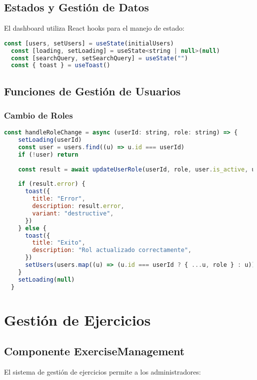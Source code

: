 \documentclass[12pt,a4paper]{article}
\begin{document}
\subsection{Estados y Gestión de Datos}

El dashboard utiliza React hooks para el manejo de estado:

\begin{lstlisting}[language=JavaScript, caption=Estados del componente AdminDashboard]
  const [users, setUsers] = useState(initialUsers)
  const [loading, setLoading] = useState<string | null>(null)
  const [searchQuery, setSearchQuery] = useState("")
  const { toast } = useToast()
\end{lstlisting}

\subsection{Funciones de Gestión de Usuarios}

\subsubsection{Cambio de Roles}
\begin{lstlisting}[language=JavaScript, caption=Función handleRoleChange]
  const handleRoleChange = async (userId: string, role: string) => {
    setLoading(userId)
    const user = users.find((u) => u.id === userId)
    if (!user) return
    
    const result = await updateUserRole(userId, role, user.is_active, user.is_professional)
    
    if (result.error) {
      toast({
        title: "Error",
        description: result.error,
        variant: "destructive",
      })
    } else {
      toast({
        title: "Exito",
        description: "Rol actualizado correctamente",
      })
      setUsers(users.map((u) => (u.id === userId ? { ...u, role } : u)))
    }
    setLoading(null)
  }
\end{lstlisting}

\section{Gestión de Ejercicios}

\subsection{Componente ExerciseManagement}

El sistema de gestión de ejercicios permite a los administradores:
\end{document}
